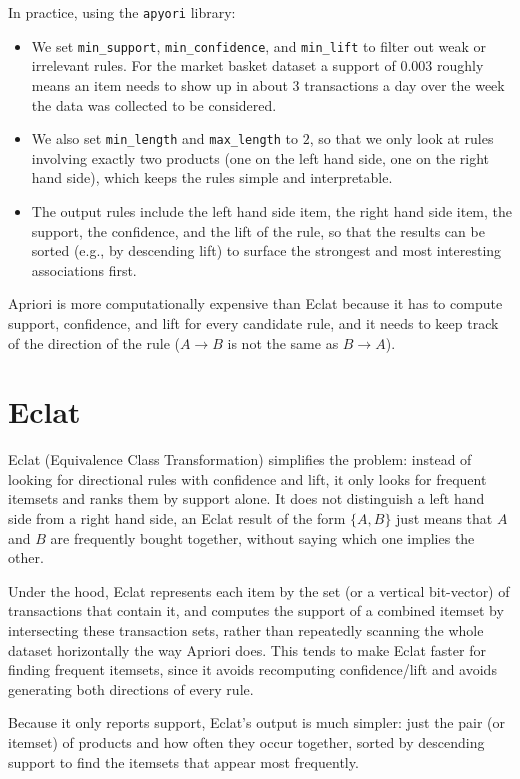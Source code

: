 \documentclass[conference]{IEEEtran}
\begin{document}
In practice, using the \texttt{apyori} library:
\begin{itemize}
    \item We set \texttt{min\_support}, \texttt{min\_confidence}, and \texttt{min\_lift} to filter out weak or irrelevant rules. For the market basket dataset a support of $0.003$ roughly means an item needs to show up in about 3 transactions a day over the week the data was collected to be considered.
    \item We also set \texttt{min\_length} and \texttt{max\_length} to $2$, so that we only look at rules involving exactly two products (one on the left hand side, one on the right hand side), which keeps the rules simple and interpretable.
    \item The output rules include the left hand side item, the right hand side item, the support, the confidence, and the lift of the rule, so that the results can be sorted (e.g., by descending lift) to surface the strongest and most interesting associations first.
\end{itemize}
Apriori is more computationally expensive than Eclat because it has to compute support, confidence, and lift for every candidate rule, and it needs to keep track of the direction of the rule ($A \rightarrow B$ is not the same as $B \rightarrow A$).

\section*{Eclat}
Eclat (Equivalence Class Transformation) simplifies the problem: instead of looking for directional rules with confidence and lift, it only looks for frequent itemsets and ranks them by support alone. It does not distinguish a left hand side from a right hand side, an Eclat result of the form $\{A, B\}$ just means that $A$ and $B$ are frequently bought together, without saying which one implies the other.

Under the hood, Eclat represents each item by the set (or a vertical bit-vector) of transactions that contain it, and computes the support of a combined itemset by intersecting these transaction sets, rather than repeatedly scanning the whole dataset horizontally the way Apriori does. This tends to make Eclat faster for finding frequent itemsets, since it avoids recomputing confidence/lift and avoids generating both directions of every rule.

Because it only reports support, Eclat's output is much simpler: just the pair (or itemset) of products and how often they occur together, sorted by descending support to find the itemsets that appear most frequently.
\end{document}
